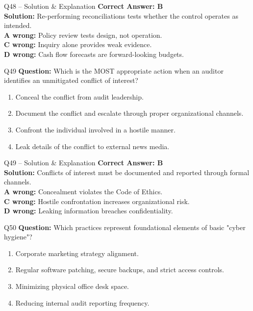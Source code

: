 \documentclass[aspectratio=169,10pt]{beamer}
\begin{document}
	\begin{frame}[t]{Q48 -- Solution \& Explanation}
		\small
		\textbf{Correct Answer: B} \\[4pt]
		\textbf{Solution:} Re-performing reconciliations tests whether the control operates as intended. \\[4pt]
		\textbf{A wrong:} Policy review tests design, not operation. \\[2pt]
		\textbf{C wrong:} Inquiry alone provides weak evidence. \\[2pt]
		\textbf{D wrong:} Cash flow forecasts are forward-looking budgets.
	\end{frame}
	
	\begin{frame}[t]{Q49}
		\small
		\textbf{Question:} Which is the MOST appropriate action when an auditor identifies an unmitigated conflict of interest?
		\begin{enumerate}[label=\Alph*.,itemsep=1pt,topsep=2pt]
			\item Conceal the conflict from audit leadership.
			\item Document the conflict and escalate through proper organizational channels.
			\item Confront the individual involved in a hostile manner.
			\item Leak details of the conflict to external news media.
		\end{enumerate}
	\end{frame}
	
	\begin{frame}[t]{Q49 -- Solution \& Explanation}
		\small
		\textbf{Correct Answer: B} \\[4pt]
		\textbf{Solution:} Conflicts of interest must be documented and reported through formal channels. \\[4pt]
		\textbf{A wrong:} Concealment violates the Code of Ethics. \\[2pt]
		\textbf{C wrong:} Hostile confrontation increases organizational risk. \\[2pt]
		\textbf{D wrong:} Leaking information breaches confidentiality.
	\end{frame}
	
	\begin{frame}[t]{Q50}
		\small
		\textbf{Question:} Which practices represent foundational elements of basic "cyber hygiene"?
		\begin{enumerate}[label=\Alph*.,itemsep=1pt,topsep=2pt]
			\item Corporate marketing strategy alignment.
			\item Regular software patching, secure backups, and strict access controls.
			\item Minimizing physical office desk space.
			\item Reducing internal audit reporting frequency.
		\end{enumerate}
	\end{frame}
	
\end{document}
